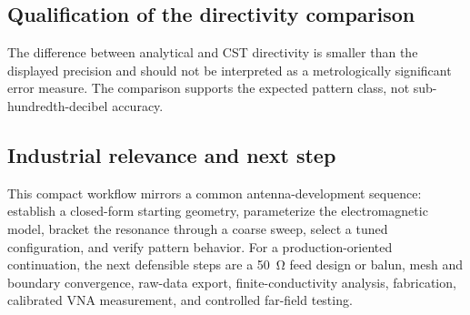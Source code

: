 \subsection{Qualification of the directivity comparison}
The difference between analytical and CST directivity is smaller than the displayed
precision and should not be interpreted as a metrologically significant error measure.
The comparison supports the expected pattern class, not sub-hundredth-decibel accuracy.

\subsection{Industrial relevance and next step}
This compact workflow mirrors a common antenna-development sequence: establish a
closed-form starting geometry, parameterize the electromagnetic model, bracket the
resonance through a coarse sweep, select a tuned configuration, and verify pattern
behavior. For a production-oriented continuation, the next defensible steps are a
\SI{50}{\ohm} feed design or balun, mesh and boundary convergence, raw-data export,
finite-conductivity analysis, fabrication, calibrated VNA measurement, and controlled
far-field testing.

